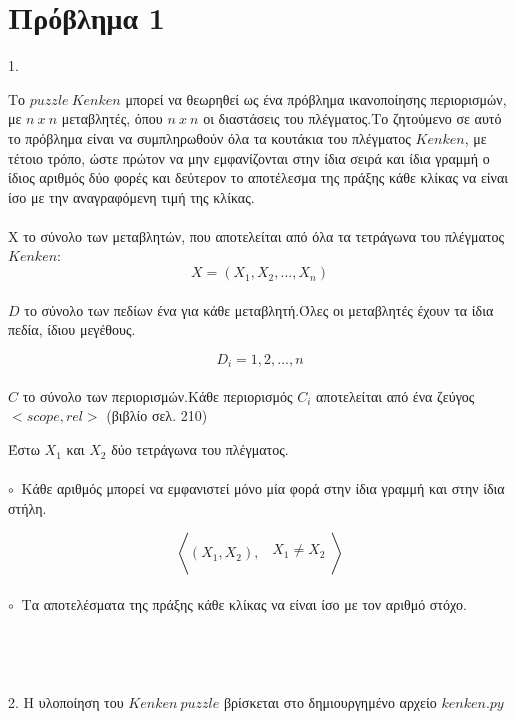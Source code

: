 \documentclass[10pt]{article}
\begin{document}
\section*{Πρόβλημα 1}
\vspace{5mm}
1.

\hspace{5mm}Το $puzzle \ Kenken$ μπορεί να θεωρηθεί ως ένα πρόβλημα ικανοποίησης περιορισμών, με $n \ x \ n$ μεταβλητές, όπου $n \ x \ n$ οι διαστάσεις του πλέγματος.Το ζητούμενο σε αυτό το πρόβλημα είναι να συμπληρωθούν όλα τα κουτάκια του πλέγματος $Kenken$, με τέτοιο τρόπο, ώστε πρώτον να μην εμφανίζονται στην ίδια σειρά και ίδια γραμμή ο ίδιος αριθμός δύο φορές και δεύτερον το αποτέλεσμα της πράξης κάθε κλίκας να είναι ίσο με την  αναγραφόμενη τιμή της κλίκας. \\ \\

Χ το σύνολο των μεταβλητών, που αποτελείται από όλα τα τετράγωνα του πλέγματος $Kenken$:
\[
X = ( X_1,X_2,...,X_n)
\] \\

$D$ το σύνολο των πεδίων ένα για κάθε μεταβλητή.Όλες οι μεταβλητές έχουν τα ίδια πεδία, ίδιου μεγέθους.

\[
D_i = {1,2,...,n}
\] \\

$C$ το σύνολο των περιορισμών.Κάθε περιορισμός $C_i$ αποτελείται από ένα ζεύγος $<scope,rel>$ (βιβλίο σελ. 210) 

Έστω $X_{1}$ και $X_2$ δύο τετράγωνα του πλέγματος. \\ \\

$\circ \ $ Κάθε αριθμός μπορεί να εμφανιστεί μόνο μία φορά στην ίδια γραμμή και στην ίδια στήλη.

\[ 
\left<   (X_1, X_2) , 
\begin{array}{ll}
\\  \ \ X_1 \neq X_2 \\ \\
     
     \end{array} 
\right > \] 
\\ 

$\circ \ $ Τα αποτελέσματα της πράξης κάθε κλίκας να είναι ίσο με τον αριθμό στόχο. \\ \\ \\ \\ \\
2. Η υλοποίηση του $Kenken \ puzzle$ βρίσκεται στο δημιουργημένο αρχείο $kenken.py$ \\
\end{document}
